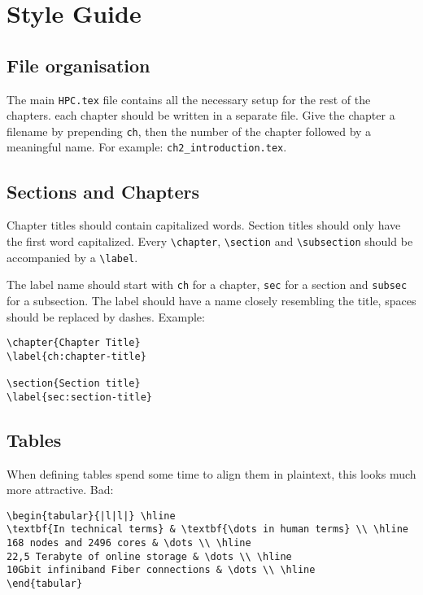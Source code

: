 \documentclass[11pt,a4paper,oneside]{book}
\begin{document}
\chapter{Style Guide}
\label{ch:style-guide}

\section{File organisation}
\label{sec:file-organisation}

The main \texttt{HPC.tex} file contains all the necessary setup for the rest of
the chapters.  each chapter should be written in a separate file. Give the
chapter a filename by prepending \texttt{ch}, then the number of the chapter
followed by a meaningful name. For example: \texttt{ch2\_introduction.tex}.

\section{Sections and Chapters}
\label{sec:sections-and-chapters}

Chapter titles should contain capitalized words. Section titles should only
have the first word capitalized.  Every \texttt{\textbackslash{}chapter},
\texttt{\textbackslash{}section} and \texttt{\textbackslash{}subsection} should
be accompanied by a \texttt{\textbackslash{}label}.

The label name should start with \texttt{ch} for a chapter, \texttt{sec} for a
section and \texttt{subsec} for a subsection. The label should have a name
closely resembling the title, spaces should be replaced by dashes. Example:

\begin{verbatim}
\chapter{Chapter Title}
\label{ch:chapter-title}

\section{Section title}
\label{sec:section-title}
\end{verbatim}

\section{Tables}
\label{sec:tables}

When defining tables spend some time to align them in plaintext, this looks much more attractive.
Bad:
\begin{verbatim}
\begin{tabular}{|l|l|} \hline
\textbf{In technical terms} & \textbf{\dots in human terms} \\ \hline
168 nodes and 2496 cores & \dots \\ \hline
22,5 Terabyte of online storage & \dots \\ \hline
10Gbit infiniband Fiber connections & \dots \\ \hline
\end{tabular}
\end{verbatim}
\end{document}
